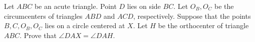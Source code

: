 Let $ ABC$ be an acute triangle.  Point $ D$ lies on side $ BC$.  Let $ O_B, O_C$ be the circumcenters of triangles $ ABD$ and $ ACD$, respectively.  Suppose that the points $ B, C, O_B, O_C$ lies on a circle centered at $ X$.  Let $ H$ be the orthocenter of triangle $ ABC$.  Prove that $ \angle{DAX} = \angle{DAH}$.
